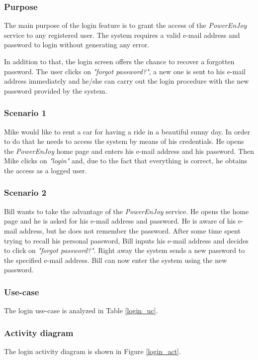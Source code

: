 \subsubsection{Purpose}
The main purpose of the login feature is to grant the access of the \emph{PowerEnJoy} service to any registered user. The system requires a valid e-mail address and password to login without generating any error.

In addition to that, the login screen offers the chance to recover a forgotten password. The user clicks on \emph{"forgot password?"}, a new one is sent to his e-mail address immediately and he/she can carry out the login procedure with the new password provided by the system.

\subsubsection{Scenario 1}
Mike would like to rent a car for having a ride in a beautiful sunny day. In order to do that he needs to access the system by means of his credentials. He opens the \emph{PowerEnJoy} home page and enters his e-mail address and his password. Then Mike clicks on \emph{"login"} and, due to the fact that everything is correct, he obtains the access as a logged user.

\subsubsection{Scenario 2}
Bill wants to take the advantage of the \emph{PowerEnJoy} service. He opens the home page and he is asked for his e-mail address and password. He is aware of his e-mail address, but he does not remember the password. After some time spent trying to recall his personal password, Bill inputs his e-mail address and decides to click on \emph{"forgot password?"}. Right away the system sends a new password to the specified e-mail address. Bill can now enter the system using the new password.

\subsubsection{Use-case}
The login use-case is analyzed in Table \ref{login_uc}.

\subsubsection{Activity diagram}
The login activity diagram is shown in Figure \ref{login_act}.

